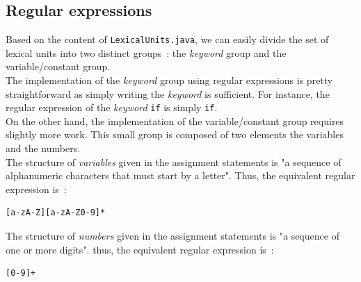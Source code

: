 \documentclass[a4paper,11pt]{article}
\begin{document}
  \subsection{Regular expressions}
    Based on the content of \verb|LexicalUnits.java|, we can easily divide the set of lexical units into two distinct groups~: the \textit{keyword} group and the variable/constant group.\\
    The implementation of the \textit{keyword} group using regular expressions is pretty straightforward as simply writing the \textit{keyword} is sufficient. For instance, the regular expression of the \textit{keyword} \verb|if| is simply \verb|if|.\\
    On the other hand, the implementation of the variable/constant group requires slightly more work. This small group is composed of two elements the variables and the numbers.\\
    The structure of \textit{variables} given in the assignment statements is "a sequence of alphanumeric characters that must start by a letter". Thus, the equivalent regular expression is~:
    \begin{verbatim}
[a-zA-Z][a-zA-Z0-9]*
    \end{verbatim}
    The structure of \textit{numbers} given in the assignment statements is "a sequence of one or more digits". thus, the equivalent regular expression is~:
    \begin{verbatim}
[0-9]+
    \end{verbatim}
  
\end{document}
